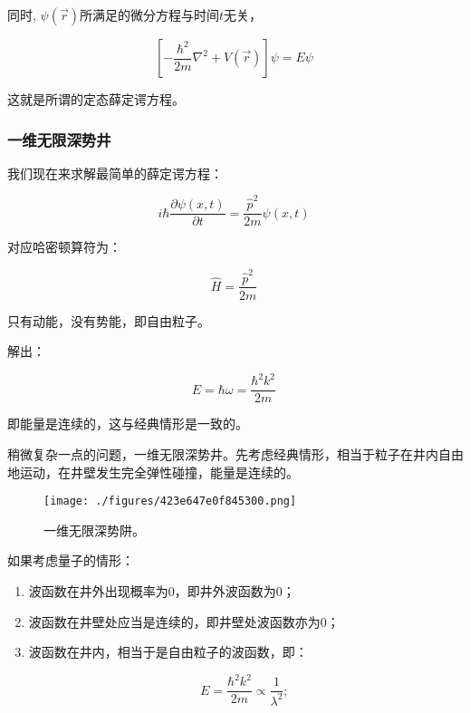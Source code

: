同时, $\psi(\vec r)$所满足的微分方程与时间$t$无关，

\begin{equation}
\left[ -\frac{\hbar^2}{2m} \nabla^2 + V(\vec{r}) \right] \psi = E \psi~
\end{equation}


这就是所谓的定态薛定谔方程。

\subsubsection{一维无限深势井}

我们现在来求解最简单的薛定谔方程：

\begin{equation}
i \hbar \frac{\partial \psi(x,t)}{\partial t} = \frac{\hat p^2}{2m}
\psi(x,t)~
\end{equation}

对应哈密顿算符为：

\begin{equation}
\hat H = \frac{\hat p^2}{2m}~
\end{equation}

只有动能，没有势能，即自由粒子。

解出：

\begin{equation}
E =\hbar \omega= \frac{\hbar^2 k^2}{2m}~
\end{equation}

即能量是连续的，这与经典情形是一致的。

稍微复杂一点的问题，一维无限深势井。先考虑经典情形，相当于粒子在井内自由地运动，在井壁发生完全弹性碰撞，能量是连续的。

\begin{figure}[ht]
\centering
\texttt{[image: ./figures/423e647e0f845300.png]}
\caption{⼀维⽆限深势阱。} \label{fig_QMPre7_3}
\end{figure}

如果考虑量子的情形：

\begin{enumerate}
\item 

波函数在井外出现概率为0，即井外波函数为0；

\item

波函数在井壁处应当是连续的，即井壁处波函数亦为0；

\item

波函数在井内，相当于是自由粒子的波函数，即：

\begin{equation}
E=\frac{\hbar^2 k^2}{2m} \propto \frac{1}{\lambda^2} ;~
\end{equation}

\end{enumerate}

